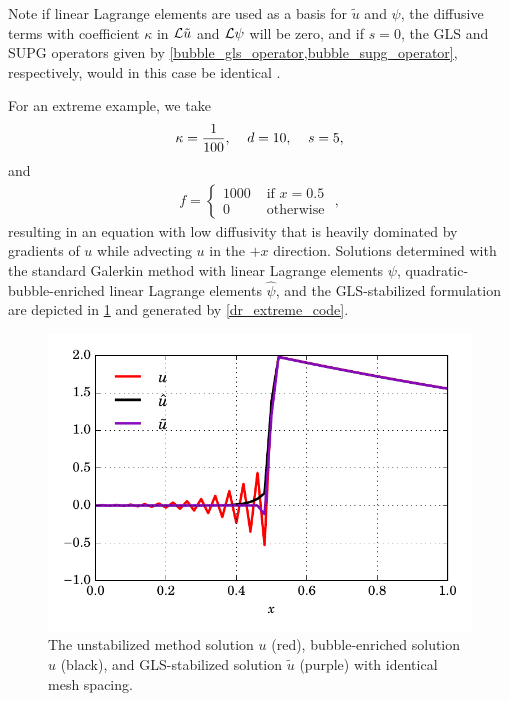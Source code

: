 Note if linear Lagrange elements are used as a basis for $\tilde{u}$ and $\psi$, the diffusive terms with coefficient $\kappa$ in $\mathcal{L} \tilde{u}$ and $\mathcal{L} \psi$ will be zero, and if $s = 0$, the GLS and SUPG operators given by \cref{bubble_gls_operator,bubble_supg_operator}, respectively, would in this case be identical \citep{hughes_1989}.

For an extreme example, we take
\begin{align*}
  \kappa = \frac{1}{100}, \hspace{4mm} d = 10, \hspace{4mm} s = 5,
\end{align*}
and
\begin{align*}
  f = \begin{cases}
        1000 & \text{ if } x = 0.5 \\
        0 & \text{ otherwise }
      \end{cases},
\end{align*}
resulting in an equation with low diffusivity that is heavily dominated by gradients of $u$ while advecting $u$ in the $+x$ direction.  Solutions determined with the standard Galerkin method with linear Lagrange elements $\psi$, quadratic-bubble-enriched linear Lagrange elements $\hat{\psi}$, and the GLS-stabilized formulation are depicted in \cref{dr_extreme_image} and generated by \cref{dr_extreme_code}.


\begin{figure}
  \centering
    \includegraphics[width=\linewidth]{images/bubbles/extreme_new.pdf}
  \caption[Advection-diffusion-reaction stabilization example]{The unstabilized method solution $u$ (red), bubble-enriched solution $\hat{u}$ (black), and GLS-stabilized solution $\tilde{u}$ (purple) with identical mesh spacing.}
  \label{dr_extreme_image}
\end{figure}




